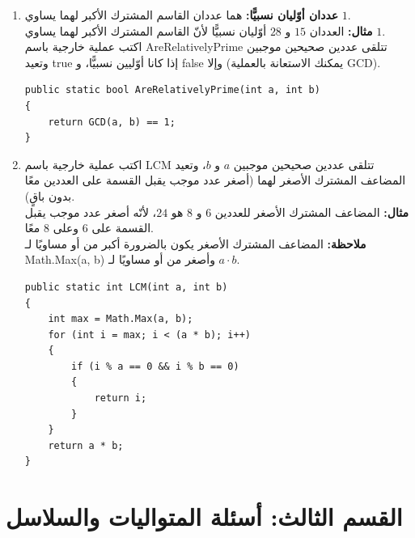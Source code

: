 \documentclass[14pt]{extarticle}
\begin{document}
\begin{enumerate}[resume, itemsep=2em]
\item \textbf{عددان أوّليان نسبيًّا:} هما عددان القاسم المشترك الأكبر لهما يساوي $1$. \\
\textbf{مثال:} العددان $15$ و $28$ أوّليان نسبيًّا لأنّ القاسم المشترك الأكبر لهما يساوي $1$. \\
اكتب عملية خارجية باسم \textenglish{AreRelativelyPrime} تتلقى عددين صحيحين موجبين وتعيد \textenglish{true} إذا كانا أوّليين نسبيًّا، و \textenglish{false} وإلا (يمكنك الاستعانة بالعملية \textenglish{GCD}).
\ifwithsols
\begin{boxSolution}
\begin{english}
\begin{verbatim}
public static bool AreRelativelyPrime(int a, int b)
{
    return GCD(a, b) == 1;
}
\end{verbatim}
\end{english}
\end{boxSolution}
\fi
\filbreak

\item اكتب عملية خارجية باسم \textenglish{LCM} تتلقى عددين صحيحين موجبين $a$ و $b$، وتعيد المضاعف المشترك الأصغر لهما (أصغر عدد موجب يقبل القسمة على العددين معًا بدون باقٍ). \\
\textbf{مثال:} المضاعف المشترك الأصغر للعددين $6$ و $8$ هو $24$، لأنّه أصغر عدد موجب يقبل القسمة على $6$ وعلى $8$ معًا. \\
\textbf{ملاحظة:} المضاعف المشترك الأصغر يكون بالضرورة أكبر من أو مساويًا لـ \textenglish{Math.Max(a, b)} وأصغر من أو مساويًا لـ $a \cdot b$.
\ifwithsols
\begin{boxSolution}
\begin{english}
\begin{verbatim}
public static int LCM(int a, int b)
{
    int max = Math.Max(a, b);
    for (int i = max; i < (a * b); i++)
    {
        if (i % a == 0 && i % b == 0)
        {
            return i;
        }
    }
    return a * b;
}
\end{verbatim}
\end{english}
\end{boxSolution}
\fi
\filbreak

\end{enumerate}

\clearpage
\section*{القسم الثالث: أسئلة المتواليات والسلاسل}
\end{document}
